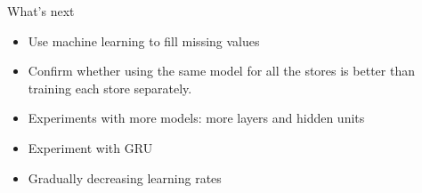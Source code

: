 \documentclass[10pt]{beamer}
\begin{document}
\begin{frame}{What's next}
    \begin{itemize}
        \item Use machine learning to fill missing values
        \item Confirm whether using the same model for all the stores is better than training each store separately.
        \item Experiments with more models: more layers and hidden units
        \item Experiment with GRU
        \item Gradually decreasing learning rates
    \end{itemize}
\end{frame}

\end{document}
